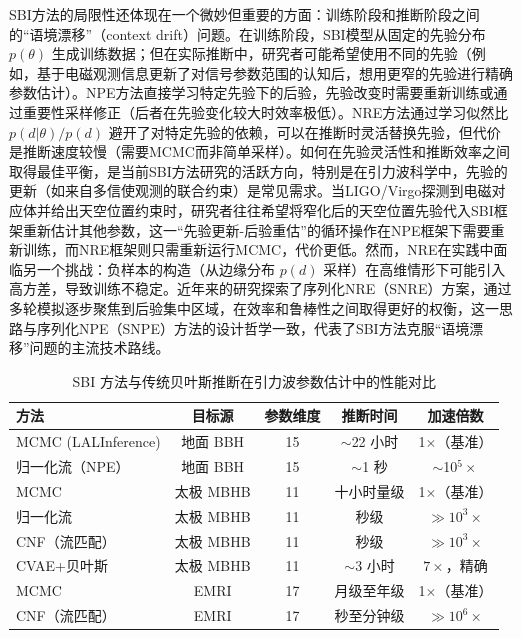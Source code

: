 SBI方法的局限性还体现在一个微妙但重要的方面：训练阶段和推断阶段之间的``语境漂移''（context drift）问题。在训练阶段，SBI模型从固定的先验分布 $p(\theta)$ 生成训练数据；但在实际推断中，研究者可能希望使用不同的先验（例如，基于电磁观测信息更新了对信号参数范围的认知后，想用更窄的先验进行精确参数估计）。NPE方法直接学习特定先验下的后验，先验改变时需要重新训练或通过重要性采样修正（后者在先验变化较大时效率极低）。NRE方法通过学习似然比 $p(d|\theta)/p(d)$ 避开了对特定先验的依赖，可以在推断时灵活替换先验，但代价是推断速度较慢（需要MCMC而非简单采样）。如何在先验灵活性和推断效率之间取得最佳平衡，是当前SBI方法研究的活跃方向，特别是在引力波科学中，先验的更新（如来自多信使观测的联合约束）是常见需求。当LIGO/Virgo探测到电磁对应体并给出天空位置约束时，研究者往往希望将窄化后的天空位置先验代入SBI框架重新估计其他参数，这一``先验更新-后验重估''的循环操作在NPE框架下需要重新训练，而NRE框架则只需重新运行MCMC，代价更低。然而，NRE在实践中面临另一个挑战：负样本的构造（从边缘分布 $p(d)$ 采样）在高维情形下可能引入高方差，导致训练不稳定。近年来的研究探索了序列化NRE（SNRE）方案，通过多轮模拟逐步聚焦到后验集中区域，在效率和鲁棒性之间取得更好的权衡，这一思路与序列化NPE（SNPE）方法的设计哲学一致，代表了SBI方法克服``语境漂移''问题的主流技术路线。

\begin{table}[htbp]
\centering
\caption{SBI 方法与传统贝叶斯推断在引力波参数估计中的性能对比}
\label{tab:sbi_comparison}
\small
\begin{tabular}{lcccc}
\hline
\textbf{方法} & \textbf{目标源} & \textbf{参数维度} & \textbf{推断时间} & \textbf{加速倍数} \\
\hline
MCMC (LALInference) & 地面 BBH & 15 & $\sim$22 小时 & 1$\times$（基准） \\
归一化流（NPE）& 地面 BBH & 15 & $\sim$1 秒 & $\sim$10$^5\times$ \\
\hline
MCMC & 太极 MBHB & 11 & 十小时量级 & 1$\times$（基准） \\
归一化流~\cite{du2024normflow} & 太极 MBHB & 11 & 秒级 & $\gg 10^3\times$ \\
CNF（流匹配）~\cite{liang2024cnfmbhb} & 太极 MBHB & 11 & 秒级 & $\gg 10^3\times$ \\
CVAE+贝叶斯~\cite{sun2025cvae} & 太极 MBHB & 11 & $\sim$3 小时 & $7\times$，精确 \\
\hline
MCMC & EMRI & 17 & 月级至年级 & 1$\times$（基准） \\
CNF（流匹配）~\cite{liang2024cnfemri} & EMRI & 17 & 秒至分钟级 & $\gg 10^6\times$ \\
\hline
\end{tabular}
\end{table}

